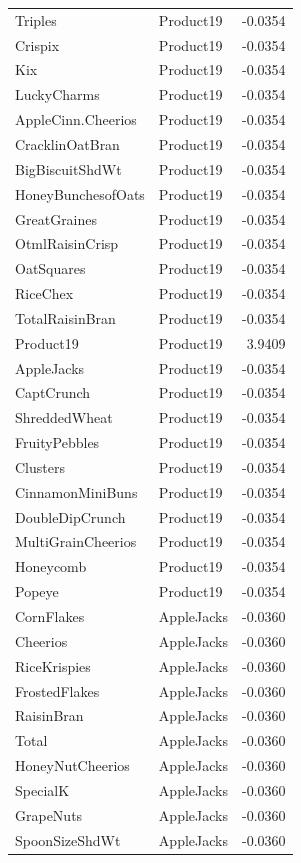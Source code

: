 \begin{longtable}{llr}
Triples & Product19 & -0.0354 \\
Crispix & Product19 & -0.0354 \\
Kix & Product19 & -0.0354 \\
LuckyCharms & Product19 & -0.0354 \\
AppleCinn.Cheerios & Product19 & -0.0354 \\
CracklinOatBran & Product19 & -0.0354 \\
BigBiscuitShdWt & Product19 & -0.0354 \\
HoneyBunchesofOats & Product19 & -0.0354 \\
GreatGraines & Product19 & -0.0354 \\
OtmlRaisinCrisp & Product19 & -0.0354 \\
OatSquares & Product19 & -0.0354 \\
RiceChex & Product19 & -0.0354 \\
TotalRaisinBran & Product19 & -0.0354 \\
Product19 & Product19 & 3.9409 \\
AppleJacks & Product19 & -0.0354 \\
CaptCrunch & Product19 & -0.0354 \\
ShreddedWheat & Product19 & -0.0354 \\
FruityPebbles & Product19 & -0.0354 \\
Clusters & Product19 & -0.0354 \\
CinnamonMiniBuns & Product19 & -0.0354 \\
DoubleDipCrunch & Product19 & -0.0354 \\
MultiGrainCheerios & Product19 & -0.0354 \\
Honeycomb & Product19 & -0.0354 \\
Popeye & Product19 & -0.0354 \\
CornFlakes & AppleJacks & -0.0360 \\
Cheerios & AppleJacks & -0.0360 \\
RiceKrispies & AppleJacks & -0.0360 \\
FrostedFlakes & AppleJacks & -0.0360 \\
RaisinBran & AppleJacks & -0.0360 \\
Total & AppleJacks & -0.0360 \\
HoneyNutCheerios & AppleJacks & -0.0360 \\
SpecialK & AppleJacks & -0.0360 \\
GrapeNuts & AppleJacks & -0.0360 \\
SpoonSizeShdWt & AppleJacks & -0.0360 \\

\end{longtable}
